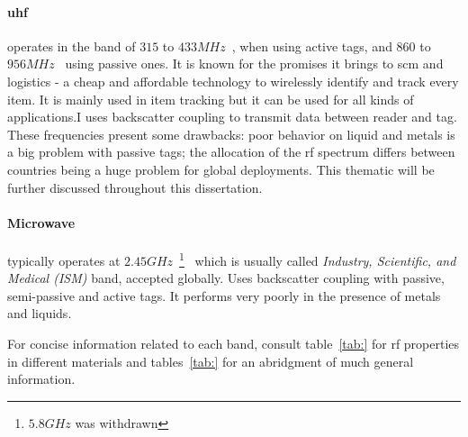 \paragraph*{\ac{uhf}} operates in the band of $315$ to $433MHz$~\cite{isoISOIEC180007}, when using active tags, and $860$ to $956MHz$~\cite{isoISOIEC180006} using passive ones. It is known for the promises it brings to \ac{scm} and logistics - a cheap and affordable technology to wirelessly identify and track every item. It is mainly used in item tracking but it can be used for all kinds of applications.I uses backscatter coupling to transmit data between reader and tag. These frequencies present some drawbacks: poor behavior on liquid and metals is a big problem with passive tags; the allocation of the \ac{rf} spectrum differs between countries being a huge problem for global deployments. This thematic will be further discussed throughout this dissertation.

\paragraph*{Microwave} typically operates at $2.45GHz$~\footnote{$5.8GHz$ was withdrawn}~\cite{isoISOIEC180004} which is usually called \emph{Industry, Scientific, and Medical (ISM)} band, accepted globally. Uses backscatter coupling with passive, semi-passive and active tags. It performs very poorly in the presence of metals and liquids. 

For concise information related to each band, consult table~\ref{tab:} for \ac{rf} properties in different materials and tables~\ref{tab:} for an abridgment of much general information.


